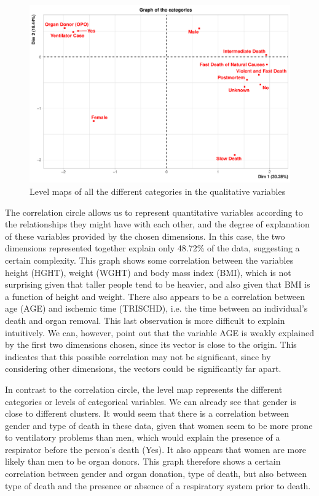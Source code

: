 \documentclass[a4paper, 11pt]{article}
\begin{document}
\begin{multicols}{2}
\begin{figure}[H]
	\centering
	\includegraphics[width=\columnwidth]{figures/clinical_correlation_plots/all_categ_Dim}
	\caption{Level maps of all the different categories in the qualitative variables}
	\label{fig:lvlMap}
\end{figure}

The correlation circle allows us to represent quantitative variables according to the relationships they might have with each other, and the degree of explanation of these variables provided by the chosen dimensions. 
In this case, the two dimensions represented together explain only 48.72\% of the data, suggesting a certain complexity. 
This graph shows some correlation between the variables height (HGHT), weight (WGHT) and body mass index (BMI), which is not surprising given that taller people tend to be heavier, and also given that BMI is a function of height and weight. 
There also appears to be a correlation between age (AGE) and ischemic time (TRISCHD), i.e. the time between an individual's death and organ removal. 
This last observation is more difficult to explain intuitively. 
We can, however, point out that the variable AGE is weakly explained by the first two dimensions chosen, since its vector is close to the origin. 
This indicates that this possible correlation may not be significant, since by considering other dimensions, the vectors could be significantly far apart.

In contrast to the correlation circle, the level map represents the different categories or levels of categorical variables. 
We can already see that gender is close to different clusters. 
It would seem that there is a correlation between gender and type of death in these data, given that women seem to be more prone to ventilatory problems than men, which would explain the presence of a respirator before the person's death (Yes). 
It also appears that women are more likely than men to be organ donors. This graph therefore shows a certain correlation between gender and organ donation, type of death, but also between type of death and the presence or absence of a respiratory system prior to death.


\end{multicols}
\end{document}
